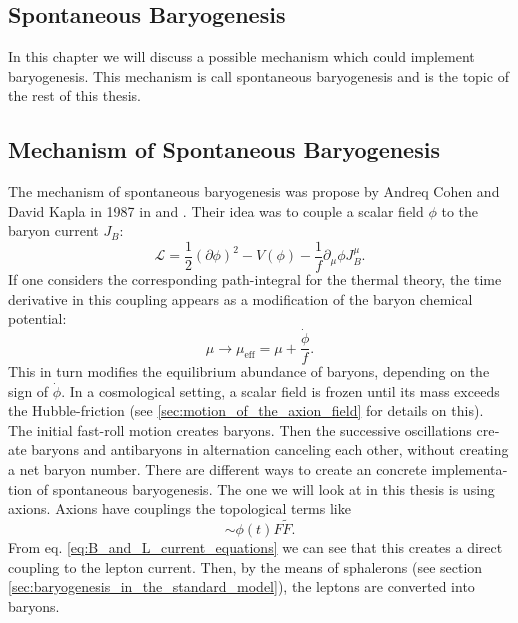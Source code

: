 \documentclass[master,       %
               twoside,        %
               BCOR10mm,       %
               english,ngerman, %
               ]{GAUBM}
\begin{document}
\begin{otherlanguage}{english}
\chapter{Spontaneous Baryogenesis}
In this chapter we will discuss a possible mechanism which could implement baryogenesis. This mechanism is call spontaneous baryogenesis and is the topic of the rest of this thesis.

\section{Mechanism of Spontaneous Baryogenesis}

The mechanism of spontaneous baryogenesis was propose by Andreq Cohen and David Kapla in 1987 in \cite{COHEN1987251} and \cite{COHEN1988913}.
Their idea was to couple a scalar field $\phi$ to the baryon current $J_B$:
\begin{equation}
	\mathcal{L} = \frac{1}{2} (\partial \phi)^2 - V(\phi) - \frac{1}{f} \partial_\mu \phi J_B^\mu.
\end{equation}
If one considers the corresponding path-integral for the thermal theory, the time derivative in this coupling appears as a modification of the baryon chemical potential:
\begin{equation}
	\mu \to \mu_\mathrm{eff} = \mu + \frac{\dot{\phi}}{f}.
\end{equation}
This in turn modifies the equilibrium abundance of baryons, depending on the sign of $\dot{\phi}$.
In a cosmological setting, a scalar field is frozen until its mass exceeds the Hubble-friction (see \ref{sec:motion_of_the_axion_field} for details on this). The initial fast-roll motion creates baryons. Then the successive oscillations create baryons and antibaryons in alternation canceling each other, without creating a net baryon number.
There are different ways to create an concrete implementation of spontaneous baryogenesis.
The one we will look at in this thesis is using axions.
Axions have couplings the topological terms like
\begin{equation}
	 \sim \phi(t) F \tilde{F}.
\end{equation}
From eq. \eqref{eq:B_and_L_current_equations} we can see that this creates a direct coupling to the lepton current.
Then, by the means of sphalerons (see section \ref{sec:baryogenesis_in_the_standard_model}), the leptons are converted into baryons.


\end{otherlanguage}
\end{document}
